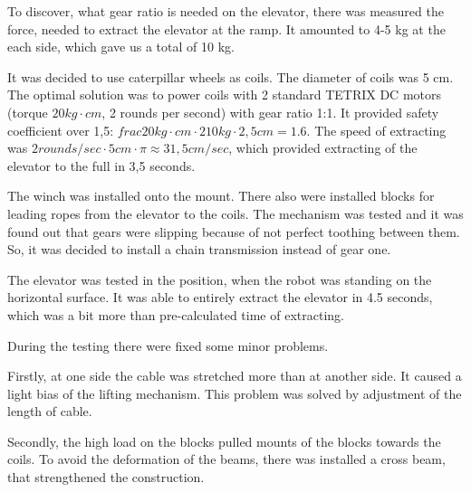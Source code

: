\begin{enumerate*}
  \item To discover, what gear ratio is needed on the elevator, there was measured the force, needed to extract the elevator at the ramp. It amounted to 4-5 kg at the each side, which gave us a total of 10 kg.

  It was decided to use caterpillar wheels as coils. The diameter of coils was 5 cm. The optimal solution was to power coils with 2 standard TETRIX DC motors (torque $20 kg \cdot cm$, 2 rounds per second) with gear ratio 1:1. It provided safety coefficient over 1,5: $frac{20 kg \cdot cm \cdot 2}{10 kg \cdot 2,5 cm} = 1.6$. The speed of extracting was $2 rounds / sec \cdot 5 cm \cdot \pi \approx 31,5 cm / sec$, which provided extracting of the elevator to the full in 3,5 seconds.

  \item The winch was installed onto the mount. There also were installed blocks for leading ropes from the elevator to the coils. The mechanism was tested and it was found out that gears were slipping because of not perfect toothing between them. So, it was decided to install a chain transmission instead of gear one. %
  

  \item The elevator was tested in the position, when the robot was standing on the horizontal surface. It was able to entirely extract the elevator in 4.5 seconds, which was a bit more than pre-calculated time of extracting.

  During the testing there were fixed some minor problems.
  \begin{enumerate*}
  	
  	\item Firstly, at one side the cable was stretched more than at another side. It caused a light bias of the lifting mechanism. This problem was solved by adjustment of the length of cable.
  	
  	\item Secondly, the high load on the blocks pulled mounts of the blocks towards the coils. To avoid the deformation of the beams, there was installed a cross beam, that strengthened the construction.
  	

\end{enumerate*}
\end{enumerate*}
